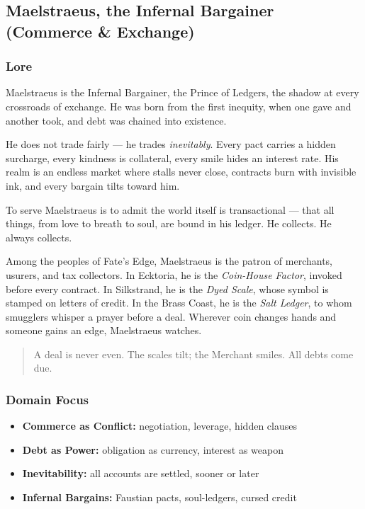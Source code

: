 
\subsection{Maelstraeus, the Infernal Bargainer (Commerce \& Exchange)}

\subsubsection*{Lore}
Maelstraeus is the Infernal Bargainer, the Prince of Ledgers, the shadow at every crossroads of exchange. He was born from the first inequity, when one gave and another took, and debt was chained into existence.

He does not trade fairly --- he trades \textit{inevitably}. Every pact carries a hidden surcharge, every kindness is collateral, every smile hides an interest rate. His realm is an endless market where stalls never close, contracts burn with invisible ink, and every bargain tilts toward him.

To serve Maelstraeus is to admit the world itself is transactional --- that all things, from love to breath to soul, are bound in his ledger. He collects. He always collects.

Among the peoples of Fate's Edge, Maelstraeus is the patron of merchants, usurers, and tax collectors. In Ecktoria, he is the \textit{Coin-House Factor}, invoked before every contract. In Silkstrand, he is the \textit{Dyed Scale}, whose symbol is stamped on letters of credit. In the Brass Coast, he is the \textit{Salt Ledger}, to whom smugglers whisper a prayer before a deal. Wherever coin changes hands and someone gains an edge, Maelstraeus watches.

\begin{quote}
A deal is never even. The scales tilt; the Merchant smiles. All debts come due.
\end{quote}

\subsubsection*{Domain Focus}
\begin{itemize}
  \item \textbf{Commerce as Conflict:} negotiation, leverage, hidden clauses
  \item \textbf{Debt as Power:} obligation as currency, interest as weapon
  \item \textbf{Inevitability:} all accounts are settled, sooner or later
  \item \textbf{Infernal Bargains:} Faustian pacts, soul-ledgers, cursed credit
\end{itemize}

